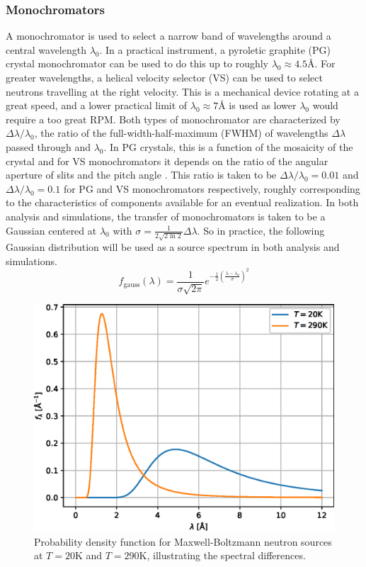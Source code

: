 \documentclass{article}
\begin{document}
\subsubsection{Monochromators}
A monochromator is used to select a narrow band of wavelengths around a central wavelength $\lambda_0$. In a practical instrument, a pyroletic graphite (PG) crystal monochromator can be used to do this up to roughly $\lambda_0 \approx 4.5 $Å. For greater wavelengths, a helical velocity selector (VS) can be used to select neutrons travelling at the right velocity. This is a mechanical device rotating at a great speed, and a lower practical limit of $\lambda_0 \approx 7$Å is used as lower $\lambda_0$ would require a too great RPM. Both types of monochromator are characterized by $\Delta\lambda/\lambda_0$, the ratio of the full-width-half-maximum (FWHM) of wavelengths $\Delta\lambda$ passed through and $\lambda_0$. In PG crystals, this is a function of the mosaicity of the crystal \cite{shapiro1972} and for VS monochromators it depends on the ratio of the angular aperture of slits and the pitch angle \cite{szewc2010}. This ratio is taken to be $\Delta\lambda/\lambda_0 = 0.01$ and $\Delta\lambda/\lambda_0 = 0.1$ for PG and VS monochromators respectively, roughly corresponding to the characteristics of components available for an eventual realization. In both analysis and simulations, the transfer of monochromators is taken to be a Gaussian centered at $\lambda_0$ with $\sigma = \frac{1}{2\sqrt{2\ln 2}}\Delta\lambda$. So in practice, the following Gaussian distribution will be used as a source spectrum in both analysis and simulations.
\begin{equation}
	f_\text{gauss}(\lambda) = \frac{1}{\sigma\sqrt{2\pi}} e^{-\frac{1}{2}(\frac{\lambda - \lambda_0}{\sigma})^2} \label{eq:gauss-spectrum}
\end{equation}
\begin{figure}
	\centering
	\includegraphics[width=0.5\linewidth]{source-spectrum}
	\caption{Probability density function for Maxwell-Boltzmann neutron sources at $T = 20 \unit{\kelvin}$ and $T = 290 \unit{\kelvin}$, illustrating the spectral differences. }
	\label{fig:source-spectrum}
\end{figure}
\end{document}
